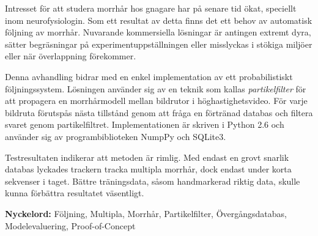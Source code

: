 
Intresset för att studera morrhår hos gnagare har på senare tid ökat, speciellt inom neurofysiologin.
Som ett resultat av detta finns det ett behov av automatisk följning av morrhår.
Nuvarande kommersiella lösningar är antingen extremt dyra, sätter begräsningar på experimentuppställningen
eller misslyckas i stökiga miljöer eller när överlappning förekommer.

Denna avhandling bidrar med en enkel implementation av ett probabilistiskt följningssystem. 
Lösningen använder sig av 
en teknik som kallas \emph{partikelfilter} för att propagera en morrhårmodell mellan bildrutor 
i höghastighetsvideo.
För varje bildruta förutspås nästa tillstånd genom att fråga en förtränad databas 
och filtera svaret genom partikelfiltret. 
Implementationen är skriven i Python 2.6 och använder sig av programbiblioteken NumpPy och SQLite3.

Testresultaten indikerar att metoden är rimlig. 
Med endast en grovt snarlik databas lyckades trackern 
tracka multipla morrhår, dock endast under korta sekvenser i taget. 
Bättre träningsdata, såsom handmarkerad riktig data, skulle kunna förbättra resultatet väsentligt.


\textbf{Nyckelord:} Följning, Multipla, Morrhår, Partikelfilter, Övergångsdatabas, Modelevaluering, Proof-of-Concept
